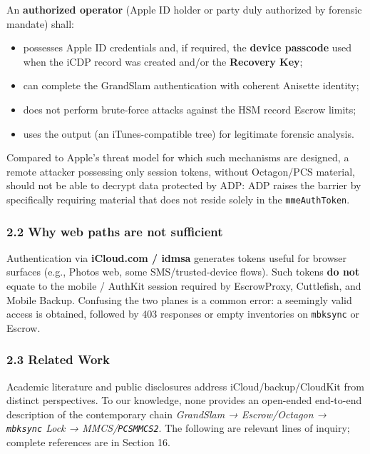\documentclass[
  english,
  10pt]{article}
\newcounter{none} %
\providecommand{\tightlist}{%
  \setlength{\itemsep}{0pt}\setlength{\parskip}{0pt}}
\begin{document}
An \textbf{authorized operator} (Apple ID holder or party duly
authorized by forensic mandate) shall:

\begin{itemize}
\tightlist
\item
  possesses Apple ID credentials and, if required, the \textbf{device
  passcode} used when the iCDP record was created and/or the
  \textbf{Recovery Key};
\item
  can complete the GrandSlam authentication with coherent Anisette
  identity;
\item
  does not perform brute-force attacks against the HSM record Escrow
  limits;
\item
  uses the output (an iTunes-compatible tree) for legitimate forensic
  analysis.
\end{itemize}

Compared to Apple's threat model for which such mechanisms are designed,
a remote attacker possessing only session tokens, without Octagon/PCS
material, should not be able to decrypt data protected by ADP: ADP
raises the barrier by specifically requiring material that does not
reside solely in the \texttt{mmeAuthToken}.

\subsubsection{2.2 Why web paths are not
sufficient}\label{why-web-paths-are-not-sufficient}

Authentication via \textbf{iCloud.com / idmsa} generates tokens useful
for browser surfaces (e.g., Photos web, some SMS/trusted-device flows).
Such tokens \textbf{do not} equate to the mobile / AuthKit session
required by EscrowProxy, Cuttlefish, and Mobile Backup. Confusing the
two planes is a common error: a seemingly valid access is obtained,
followed by 403 responses or empty inventories on \texttt{mbksync} or
Escrow.

\subsubsection{2.3 Related Work}\label{related-work}

Academic literature and public disclosures address
iCloud/backup/CloudKit from distinct perspectives. To our knowledge,
none provides an open-ended end-to-end description of the contemporary
chain \emph{GrandSlam → Escrow/Octagon → \texttt{mbksync} Lock →
MMCS/\texttt{PCSMMCS2}}. The following are relevant lines of inquiry;
complete references are in Section 16.
\end{document}

